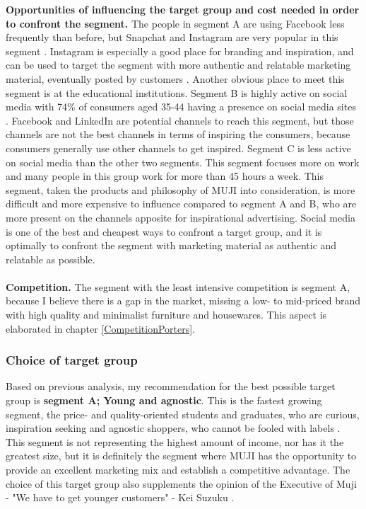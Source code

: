 \textbf{Opportunities of influencing the target group and cost needed in order to confront the segment.} The people in segment A are using Facebook less frequently than before, but Snapchat and Instagram are very popular in this segment \cite[13]{ConsumerLifestyles}. Instagram is especially a good place for branding and inspiration, and can be used to target the segment with more authentic and relatable marketing material, eventually posted by customers \cite{GetReal}. Another obvious place to meet this segment is at the educational institutions. Segment B is highly active on social media with 74\% of consumers aged 35-44 having a presence on social media sites \cite[15]{ConsumerLifestyles}. Facebook and LinkedIn are potential channels to reach this segment, but those channels are not the best channels in terms of inspiring the consumers, because consumers generally use other channels to get inspired. Segment C is less active on social media than the other two segments. This segment focuses more on work and many people in this group work for more than 45 hours a week. This segment, taken the products and philosophy of MUJI into consideration, is more difficult and more expensive to influence compared to segment A and B, who are more present on the channels apposite for inspirational advertising. Social media is one of the best and cheapest ways to confront a target group, and it is optimally to confront the segment with marketing material as authentic and relatable as possible. 
\\\\
\textbf{Competition.} The segment with the least intensive competition is segment A, because I believe there is a gap in the market, missing a low- to mid-priced brand with high quality and minimalist furniture and housewares. This aspect is elaborated in chapter \ref{CompetitionPorters}.


\subsubsection{Choice of target group}
Based on previous analysis, my recommendation for the best possible target group is \textbf{segment A; Young and agnostic}. This is the fastest growing segment, the price- and quality-oriented students and graduates, who are curious, inspiration seeking and agnostic shoppers, who cannot be fooled with labels \cite{Top10Trends}. This segment is not representing the highest amount of income, nor has it the greatest size, but it is definitely the segment where MUJI has the opportunity to provide an excellent marketing mix and establish a competitive advantage. The choice of this target group also supplements the opinion of the Executive of Muji - "We have to get younger customers" - Kei Suzuku \cite{FutureGrowth}.
